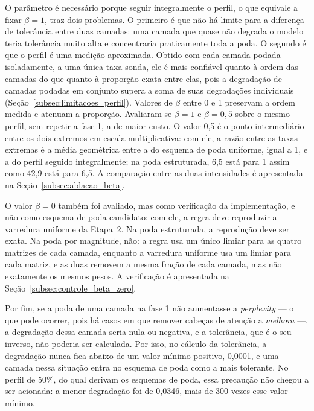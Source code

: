 O parâmetro é necessário porque seguir integralmente o perfil, o que equivale a fixar
$\beta = 1$, traz dois problemas. O primeiro é que não há limite para a diferença de
tolerância entre duas camadas: uma camada que quase não degrada o modelo teria tolerância
muito alta e concentraria praticamente toda a poda. O segundo é que o perfil é uma medição
aproximada. Obtido com cada camada podada isoladamente, a uma única taxa-sonda, ele é mais
confiável quanto à ordem das camadas do que quanto à proporção exata entre elas, pois a
degradação de camadas podadas em conjunto supera a soma de suas degradações individuais
(Seção~\ref{subsec:limitacoes_perfil}). Valores de $\beta$ entre 0 e 1 preservam a ordem
medida e atenuam a proporção. Avaliaram-se $\beta = 1$ e $\beta = 0{,}5$ sobre o mesmo
perfil, sem repetir a fase 1, a de maior custo. O valor 0,5 é o ponto intermediário entre
os dois extremos em escala multiplicativa: com ele, a razão entre as taxas extremas é a
média geométrica entre a do esquema de poda uniforme, igual a 1, e a do perfil seguido
integralmente; na poda estruturada, 6,5 está para 1 assim como 42,9 está para 6,5. A
comparação entre as duas intensidades é apresentada na Seção~\ref{subsec:ablacao_beta}.

O valor $\beta = 0$ também foi avaliado, mas como verificação da implementação, e não como
esquema de poda candidato: com ele, a regra deve reproduzir a varredura uniforme da Etapa~2.
Na poda estruturada, a reprodução deve ser exata. Na poda por magnitude, não: a regra usa um
único limiar para as quatro matrizes de cada camada, enquanto a varredura uniforme usa um
limiar para cada matriz, e as duas removem a mesma fração de cada camada, mas não exatamente
os mesmos pesos. A verificação é apresentada na Seção~\ref{subsec:controle_beta_zero}.

Por fim, se a poda de uma camada na fase 1 não aumentasse a \textit{perplexity} --- o que
pode ocorrer, pois há casos em que remover cabeças de atenção a \textit{melhora}
\cite{Michel2019} ---, a degradação dessa camada seria nula ou negativa, e a tolerância, que
é o seu inverso, não poderia ser calculada. Por isso, no cálculo da tolerância, a degradação
nunca fica abaixo de um valor mínimo positivo, 0,0001, e uma camada nessa situação entra no
esquema de poda como a mais tolerante. No perfil de 50\%, do qual derivam os esquemas de poda, essa precaução não chegou a ser
acionada: a menor degradação foi de 0,0346, mais de 300 vezes esse valor mínimo.


